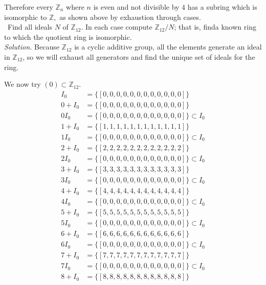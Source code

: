 \documentclass[11pt]{amsart}
\begin{document}
 Therefore every $\mathbb{Z}_n$ where $n$ is even and not divisible by $4$ has a subring which is isomorphic to $\mathbb{Z},$ as shown above by exhaustion through cases.\\

\medskip {}\ Find all ideals $N$ of $\mathbb{Z}_12$. In each case compute $\mathbb{Z}_{12} / N$; that is, finda  known ring to which the quotient ring is isomorphic.\\
\emph{Solution.} Because $\mathbb{Z}_{12}$ is a cyclic additive group, all the elements generate an ideal in $\mathbb{Z}_{12}$, so we will exhaust all generators and find the unique set of ideals for the ring.

We now try $(0) \subset \mathbb{Z}_{12}$.
\begin{equation*}
\begin{aligned}
I_0 &= \{[0, 0, 0, 0, 0, 0, 0, 0, 0, 0, 0, 0]\} \\
0+ I_0 &= \{[0, 0, 0, 0, 0, 0, 0, 0, 0, 0, 0, 0]\}\\
0 I_0 &= \{[0, 0, 0, 0, 0, 0, 0, 0, 0, 0, 0, 0]\} \subset I_0 \\
1+ I_0 &= \{[1, 1, 1, 1, 1, 1, 1, 1, 1, 1, 1, 1]\}\\
1 I_0 &= \{[0, 0, 0, 0, 0, 0, 0, 0, 0, 0, 0, 0]\} \subset I_0 \\
2+ I_0 &= \{[2, 2, 2, 2, 2, 2, 2, 2, 2, 2, 2, 2]\}\\
2 I_0 &= \{[0, 0, 0, 0, 0, 0, 0, 0, 0, 0, 0, 0]\} \subset I_0 \\
3+ I_0 &= \{[3, 3, 3, 3, 3, 3, 3, 3, 3, 3, 3, 3]\}\\
3 I_0 &= \{[0, 0, 0, 0, 0, 0, 0, 0, 0, 0, 0, 0]\} \subset I_0 \\
4+ I_0 &= \{[4, 4, 4, 4, 4, 4, 4, 4, 4, 4, 4, 4]\}\\
4 I_0 &= \{[0, 0, 0, 0, 0, 0, 0, 0, 0, 0, 0, 0]\} \subset I_0 \\
5+ I_0 &= \{[5, 5, 5, 5, 5, 5, 5, 5, 5, 5, 5, 5]\}\\
5 I_0 &= \{[0, 0, 0, 0, 0, 0, 0, 0, 0, 0, 0, 0]\} \subset I_0 \\
6+ I_0 &= \{[6, 6, 6, 6, 6, 6, 6, 6, 6, 6, 6, 6]\}\\
6 I_0 &= \{[0, 0, 0, 0, 0, 0, 0, 0, 0, 0, 0, 0]\} \subset I_0 \\
7+ I_0 &= \{[7, 7, 7, 7, 7, 7, 7, 7, 7, 7, 7, 7]\}\\
7 I_0 &= \{[0, 0, 0, 0, 0, 0, 0, 0, 0, 0, 0, 0]\} \subset I_0 \\
8+ I_0 &= \{[8, 8, 8, 8, 8, 8, 8, 8, 8, 8, 8, 8]\}\\

\end{aligned}
\end{equation*}
\end{document}
